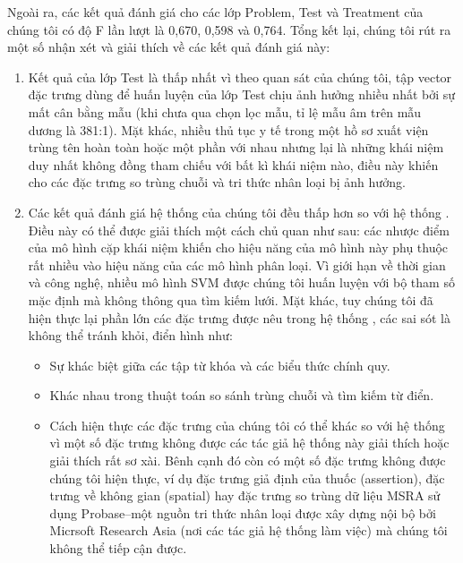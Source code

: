 Ngoài ra, các kết quả đánh giá cho các lớp Problem, Test và Treatment của chúng tôi có độ F lần lượt là 0,670, 0,598 và 0,764. Tổng kết lại, chúng tôi rút ra một số nhận xét và giải thích về các kết quả đánh giá này:
\begin{enumerate}
\item Kết quả của lớp Test là thấp nhất vì theo quan sát của chúng tôi, tập vector đặc trưng dùng để huấn luyện của lớp Test chịu ảnh hưởng nhiều nhất bởi sự mất cân bằng mẫu (khi chưa qua chọn lọc mẫu, tỉ lệ mẫu âm trên mẫu dương là 381:1). Mặt khác, nhiều thủ tục y tế trong một hồ sơ xuất viện trùng tên hoàn toàn hoặc một phần với nhau nhưng lại là những khái niệm duy nhất không đồng tham chiếu với bất kì khái niệm nào, điều này khiến cho các đặc trưng so trùng chuỗi và tri thức nhân loại bị ảnh hưởng.
\item Các kết quả đánh giá hệ thống của chúng tôi đều thấp hơn so với hệ thống \cite{YanXu2012}. Điều này có thể được giải thích một cách chủ quan như sau: các nhược điểm của mô hình cặp khái niệm khiến cho hiệu năng của mô hình này phụ thuộc rất nhiều vào hiệu năng của các mô hình phân loại. Vì giới hạn về thời gian và công nghệ, nhiều mô hình SVM được chúng tôi huấn luyện với bộ tham số mặc định mà không thông qua tìm kiếm lưới. Mặt khác, tuy chúng tôi đã hiện thực lại phần lớn các đặc trưng được nêu trong hệ thống \cite{YanXu2012}, các sai sót là không thể tránh khỏi, điển hình như:
\begin{itemize}
\item Sự khác biệt giữa các tập từ khóa và các biểu thức chính quy.
\item Khác nhau trong thuật toán so sánh trùng chuỗi và tìm kiếm từ điển.
\item Cách hiện thực các đặc trưng của chúng tôi có thể khác so với hệ thống \cite{YanXu2012} vì một số đặc trưng không được các tác giả hệ thống này giải thích hoặc giải thích rất sơ xài. Bênh cạnh đó còn có một số đặc trưng không được chúng tôi hiện thực, ví dụ đặc trưng giả định của thuốc (assertion), đặc trưng về không gian (spatial) hay đặc trưng so trùng dữ liệu MSRA sử dụng Probase--một nguồn tri thức nhân loại được xây dựng nội bộ bởi Micrsoft Research Asia (nơi các tác giả hệ thống \cite{YanXu2012} làm việc) mà chúng tôi không thể tiếp cận được.
\end{itemize}
\end{enumerate}
